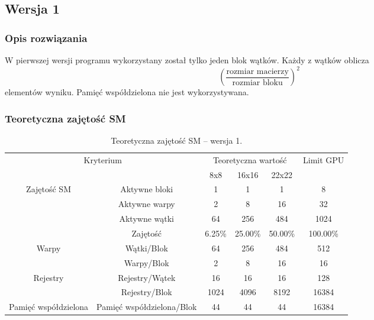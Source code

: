 
\subsection{Wersja 1}

\subsubsection{Opis rozwiązania}

W pierwszej wersji programu wykorzystany został tylko jeden blok wątków. Każdy z wątków oblicza $$ {\left(\frac{\text{rozmiar macierzy}}{\text{rozmiar bloku}}\right)}^{2} $$ elementów wyniku. Pamięć współdzielona nie jest wykorzystywana.



\subsubsection{Teoretyczna zajętość SM}

\begin{center}
\begin{table}[H]
\centering
\begin{tabular}{|c|c|c|c|c|c|}
\hline
\multicolumn{2}{|c|}{\multirow{2}{*}{Kryterium}} & \multicolumn{3}{c|}{Teoretyczna wartość} & \multirow{2}{*}{Limit GPU} \\ \cline{3-5}
\multicolumn{2}{|c|}{} & 8x8 & 16x16 & 22x22 & \\ \hline
\multirow{4}{*}{Zajętość SM} & Aktywne bloki & 1 & 1 & 1 & 8 \\ \cline{2-6}
& Aktywne warpy & 2 & 8 & 16 & 32 \\ \cline{2-6}
& Aktywne wątki & 64 & 256 & 484 & 1024 \\ \cline{2-6}
& Zajętość & 6.25\% & 25.00\% & 50.00\% & 100.00\% \\ \hline
\multirow{2}{*}{Warpy} & Wątki/Blok & 64 & 256 & 484 & 512 \\ \cline{2-6}
& Warpy/Blok & 2 & 8 & 16 & 16 \\ \hline
\multirow{2}{*}{Rejestry} & Rejestry/Wątek & 16 & 16 & 16 & 128 \\ \cline{2-6}
& Rejestry/Blok & 1024 & 4096 & 8192 & 16384 \\ \hline
\multirow{1}{*}{Pamięć współdzielona} & Pamięć współdzielona/Blok & 44 & 44 & 44 & 16384 \\ \hline
\end{tabular}
\caption{Teoretyczna zajętość SM -- wersja 1.}
\end{table}
\end{center}


